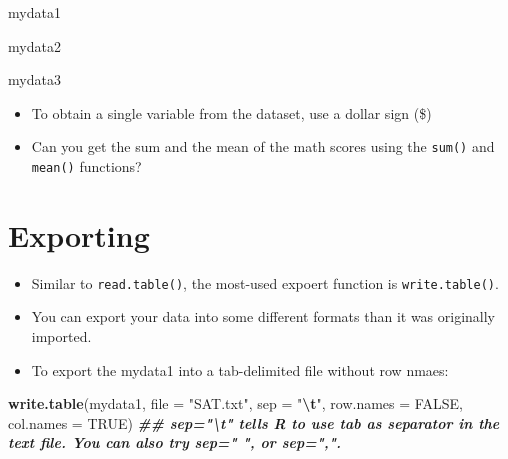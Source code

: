 \documentclass[
]{book}
\newenvironment{Shaded}{\begin{snugshade}}{\end{snugshade}}
\newcommand{\AttributeTok}[1]{\textcolor[rgb]{0.13,0.29,0.53}{#1}}
\newcommand{\ConstantTok}[1]{\textcolor[rgb]{0.56,0.35,0.01}{#1}}
\newcommand{\DocumentationTok}[1]{\textcolor[rgb]{0.56,0.35,0.01}{\textbf{\textit{#1}}}}
\newcommand{\FunctionTok}[1]{\textcolor[rgb]{0.13,0.29,0.53}{\textbf{#1}}}
\newcommand{\NormalTok}[1]{#1}
\newcommand{\SpecialCharTok}[1]{\textcolor[rgb]{0.81,0.36,0.00}{\textbf{#1}}}
\newcommand{\StringTok}[1]{\textcolor[rgb]{0.31,0.60,0.02}{#1}}
\providecommand{\tightlist}{%
  \setlength{\itemsep}{0pt}\setlength{\parskip}{0pt}}
\begin{document}
\begin{Shaded}
\begin{Highlighting}[]
\NormalTok{mydata1}

\NormalTok{mydata2}

\NormalTok{mydata3}
\end{Highlighting}
\end{Shaded}

\begin{itemize}
\tightlist
\item
  To obtain a single variable from the dataset, use a dollar sign (\$)
\end{itemize}

\begin{Shaded}
\end{Shaded}

\begin{itemize}
\tightlist
\item
  Can you get the sum and the mean of the math scores using the \texttt{sum()} and \texttt{mean()} functions?
\end{itemize}

\section{Exporting}\label{exporting}

\begin{itemize}
\tightlist
\item
  Similar to \texttt{read.table()}, the most-used expoert function is \texttt{write.table()}.
\item
  You can export your data into some different formats than it was originally imported.
\item
  To export the mydata1 into a tab-delimited file without row nmaes:
\end{itemize}

\begin{Shaded}
\begin{Highlighting}[]
\FunctionTok{write.table}\NormalTok{(mydata1, }\AttributeTok{file =} \StringTok{"SAT.txt"}\NormalTok{, }\AttributeTok{sep =} \StringTok{"}\SpecialCharTok{\textbackslash{}t}\StringTok{"}\NormalTok{, }\AttributeTok{row.names =} \ConstantTok{FALSE}\NormalTok{, }\AttributeTok{col.names =} \ConstantTok{TRUE}\NormalTok{)}
\DocumentationTok{\#\# sep="\textbackslash{}t" tells R to use tab as separator in the text file. You can also try sep=" ", or sep=",".}
\end{Highlighting}
\end{Shaded}
\end{document}
